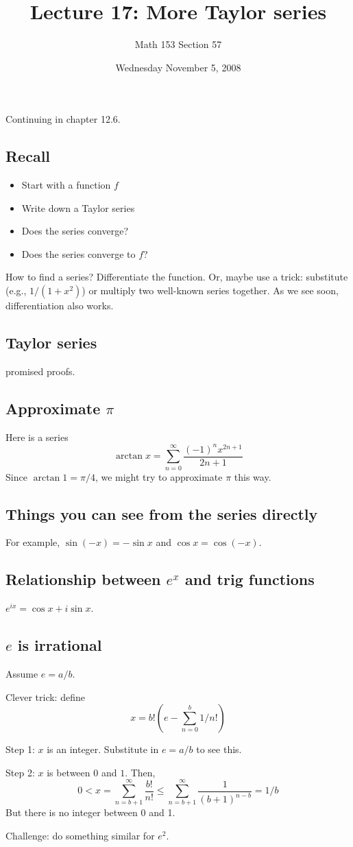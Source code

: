 \documentclass[12pt]{article}
\title{Lecture 17: More Taylor series}
\author{Math 153 Section 57}
\date{Wednesday November  5, 2008}
\begin{document}
\maketitle

Continuing in chapter 12.6.

\subsection{Recall}

\begin{itemize}
\item Start with a function $f$
\item Write down a Taylor series
\item Does the series converge?
\item Does the series converge to $f$?
\end{itemize}

How to find a series?  Differentiate the function.  Or, maybe use a
trick: substitute (e.g., $1/(1+x^2)$) or multiply two well-known
series together.  As we see soon, differentiation also works.

\subsection{Taylor series}

promised proofs.

\subsection{Approximate $\pi$}

Here is a series
$$
\arctan x = \sum_{n=0}^\infty \frac{(-1)^n x^{2n+1}}{2n + 1}
$$
Since $\arctan 1 = \pi/4$, we might try to approximate $\pi$ this way.



\subsection{Things you can see from the series directly}

For example, $\sin (-x) = - \sin x$ and $\cos x = \cos (-x)$.

\subsection{Relationship between $e^x$ and trig functions}

$e^{ix} = \cos x + i \sin x$.

\subsection{$e$ is irrational}

Assume $e = a/b$.

Clever trick: define
$$
x = b! ( e - \sum_{n=0}^b 1/n! )
$$

Step 1: $x$ is an integer.  Substitute in $e = a/b$ to see this.

Step 2: $x$ is between 0 and $1$.  
Then,
$$
0 < x = \sum_{n=b+1}^\infty \frac{b!}{n!} \leq \sum_{n=b+1}^\infty \frac{1}{(b+1)^{n-b}} = 1/b
$$
But there is no integer between 0 and 1.

Challenge: do something similar for $e^2$.
\end{document}
